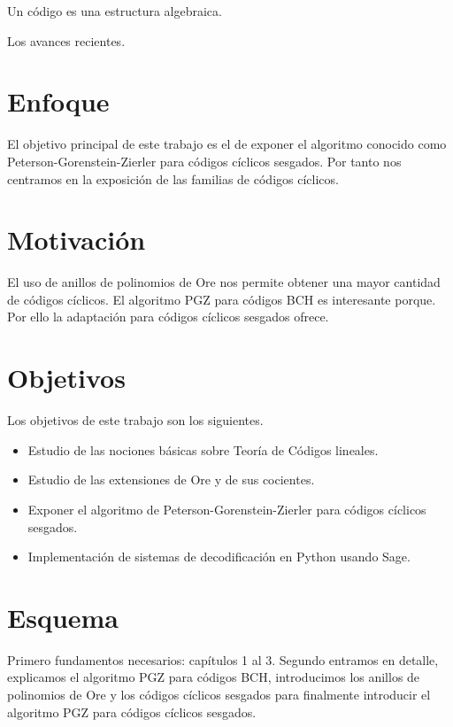 Un código es una estructura algebraica.

Los avances recientes.

\section*{Enfoque}

El objetivo principal de este trabajo es el de exponer el algoritmo conocido como Peterson-Gorenstein-Zierler para códigos cíclicos sesgados.
Por tanto nos centramos en la exposición de las familias de códigos cíclicos.

\section*{Motivación}

El uso de anillos de polinomios de Ore nos permite obtener una mayor cantidad de códigos cíclicos.
El algoritmo PGZ para códigos BCH es interesante porque.
Por ello la adaptación para códigos cíclicos sesgados ofrece.

\section*{Objetivos}

Los objetivos de este trabajo son los siguientes. \begin{itemize}
  \item Estudio de las nociones básicas sobre Teoría de Códigos lineales.
  \item Estudio de las extensiones de Ore y de sus cocientes.
  \item Exponer el algoritmo de Peterson-Gorenstein-Zierler para códigos cíclicos sesgados.
  \item Implementación de sistemas de decodificación en Python usando Sage.
\end{itemize}

\section*{Esquema}

Primero fundamentos necesarios: capítulos 1 al 3.
Segundo entramos en detalle, explicamos el algoritmo PGZ para códigos BCH, introducimos los anillos de polinomios de Ore y los códigos cíclicos sesgados para finalmente introducir el algoritmo PGZ para códigos cíclicos sesgados.



